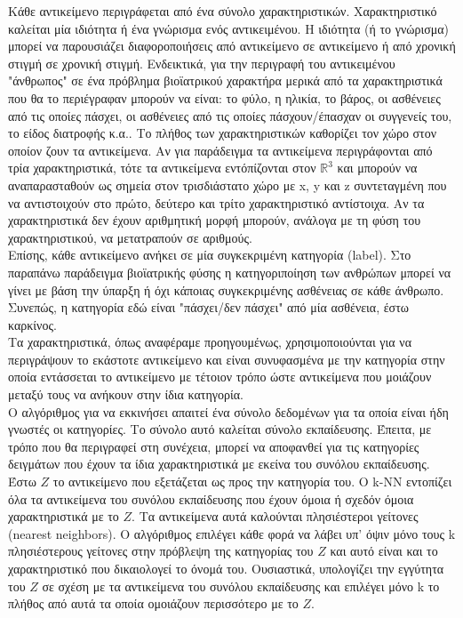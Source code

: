 \documentclass[12pt]{article}
\newcommand{\R}{\mathbb{R}}
\begin{document}
Κάθε αντικείμενο περιγράφεται από ένα σύνολο χαρακτηριστικών. Χαρακτηριστικό καλείται μία ιδιότητα ή ένα γνώρισμα ενός αντικειμένου. Η ιδιότητα (ή το γνώρισμα) μπορεί να παρουσιάζει διαφοροποιήσεις από αντικείμενο σε αντικείμενο ή από χρονική στιγμή σε χρονική στιγμή. Ενδεικτικά, για την περιγραφή του αντικειμένου "άνθρωπος" σε ένα πρόβλημα βιοϊατρικού χαρακτήρα μερικά από τα χαρακτηριστικά που θα το περιέγραφαν μπορούν να είναι: το φύλο, η ηλικία, το βάρος, οι ασθένειες από τις οποίες πάσχει, οι ασθένειες από τις οποίες πάσχουν/έπασχαν οι συγγενείς του, το είδος διατροφής κ.α.. Το πλήθος των χαρακτηριστικών καθορίζει τον χώρο στον οποίον ζουν τα αντικείμενα. Αν για παράδειγμα τα αντικείμενα περιγράφονται από τρία χαρακτηριστικά, τότε τα αντικείμενα εντόπίζονται στον \(\R^3\) και μπορούν να αναπαρασταθούν ως σημεία στον τρισδιάστατο χώρο με x, y και z συντεταγμένη που να αντιστοιχούν στο πρώτο, δεύτερο και τρίτο χαρακτηριστικό αντίστοιχα. Αν τα χαρακτηριστικά δεν έχουν αριθμητική μορφή μπορούν, ανάλογα με τη φύση του χαρακτηριστικού, να μετατραπούν σε αριθμούς.  \\

Επίσης, κάθε αντικείμενο ανήκει σε μία συγκεκριμένη κατηγορία (label). Στο παραπάνω παράδειγμα βιοϊατρικής φύσης η κατηγοριποίηση των ανθρώπων μπορεί να γίνει με βάση την ύπαρξη ή όχι κάποιας συγκεκριμένης ασθένειας σε κάθε άνθρωπο. Συνεπώς, η κατηγορία εδώ είναι "πάσχει/δεν πάσχει" από μία ασθένεια, έστω καρκίνος. \\

Τα χαρακτηριστικά, όπως αναφέραμε προηγουμένως, χρησιμοποιούνται για να περιγράψουν το εκάστοτε αντικείμενο και είναι συνυφασμένα με την κατηγορία στην οποία εντάσσεται το αντικείμενο με τέτοιον τρόπο ώστε αντικείμενα που μοιάζουν μεταξύ τους να ανήκουν στην ίδια κατηγορία. \\

Ο αλγόριθμος για να εκκινήσει απαιτεί ένα σύνολο δεδομένων για τα οποία είναι ήδη γνωστές οι κατηγορίες. Το σύνολο αυτό καλείται σύνολο εκπαίδευσης. Έπειτα, με τρόπο που θα περιγραφεί στη συνέχεια, μπορεί να αποφανθεί για τις κατηγορίες δειγμάτων που έχουν τα ίδια χαρακτηριστικά με εκείνα του συνόλου εκπαίδευσης.  \\

Έστω \(Z\) το αντικείμενο που εξετάζεται ως προς την κατηγορία του. Ο k-NN εντοπίζει όλα τα αντικείμενα του συνόλου εκπαίδευσης που έχουν όμοια ή σχεδόν όμοια χαρακτηριστικά με το \(Z\). Τα αντικείμενα αυτά καλούνται πλησιέστεροι γείτονες (nearest neighbors). Ο αλγόριθμος επιλέγει κάθε φορά να λάβει υπ' όψιν μόνο τους k πλησιέστερους γείτονες στην πρόβλεψη της κατηγορίας του \(Z\) και αυτό είναι και το χαρακτηριστικό που δικαιολογεί το όνομά του. Ουσιαστικά, υπολογίζει την εγγύτητα του \(Z\) σε σχέση με τα αντικείμενα του συνόλου εκπαίδευσης και επιλέγει μόνο k το πλήθος από αυτά τα οποία ομοιάζουν περισσότερο με το \(Z\). \\
\end{document}
